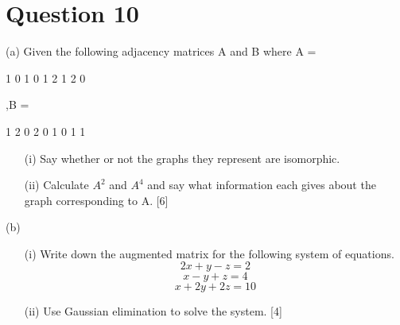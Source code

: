 \documentclass[12pt]{article} %
\begin{document}
\section*{Question 10}

(a) Given the following adjacency matrices A and B where
A =

1 0 1
0 1 2
1 2 0

,B =

1 2 0
2 0 1
0 1 1



\begin{itemize}
	\item[(i)] Say whether or not the graphs they represent are isomorphic.
	\item[(ii)] Calculate $A^2$ and $A^4$ and say what information each gives about the graph
	corresponding to A. [6]
\end{itemize}
	(b) 
	\begin{itemize}
		\item[(i)] Write down the augmented matrix for the following system of equations.
		\[2x + y - z = 2\]
		\[x - y + z = 4\]
		\[x + 2y + 2z = 10\]
		\item[(ii)] Use Gaussian elimination to solve the system. [4]
	\end{itemize}


\newpage
\end{document}
